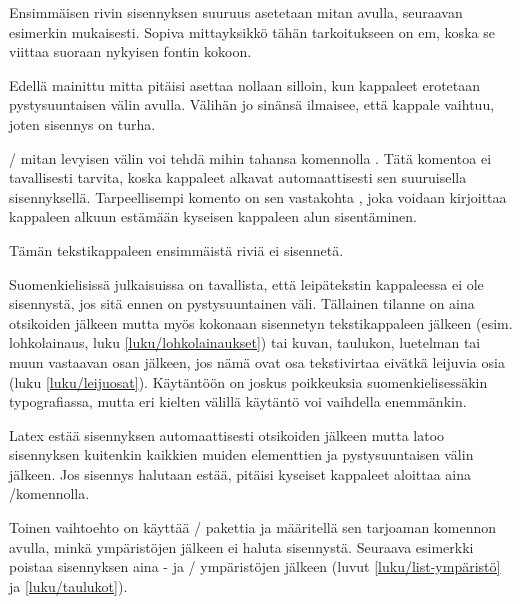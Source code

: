 Ensimmäisen rivin sisennyksen suuruus asetetaan mitan 
avulla, seuraavan esimerkin mukaisesti. Sopiva mittayksikkö tähän
tarkoitukseen on em, koska se viittaa suoraan nykyisen fontin kokoon.

\begin{koodilohkosis}
\setlength{\parindent}{1em}
\end{koodilohkosis}

\noindent
Edellä mainittu mitta pitäisi asettaa nollaan silloin, kun kappaleet
erotetaan pystysuuntaisen välin avulla. Välihän jo sinänsä ilmaisee,
että kappale vaihtuu, joten sisennys on turha.

\begin{koodilohkosis}
\setlength{\parskip}{1.3ex plus .2ex minus .1ex}
\setlength{\parindent}{0em}  %
\end{koodilohkosis}

\noindent
{}\-/ mitan levyisen välin voi tehdä mihin tahansa
komennolla . Tätä komentoa ei tavallisesti tarvita,
koska kappaleet alkavat automaattisesti sen suuruisella sisennyksellä.
Tarpeellisempi komento on sen vastakohta , joka
voidaan kirjoittaa kappaleen alkuun estämään kyseisen kappaleen alun
sisentäminen.

\begin{koodilohkosis}
\noindent
Tämän tekstikappaleen ensimmäistä riviä ei sisennetä.
\end{koodilohkosis}

\noindent
Suomenkielisissä julkaisuissa on tavallista, että leipätekstin
kappaleessa ei ole sisennystä, jos sitä ennen on pystysuuntainen väli.
Tällainen tilanne on aina otsikoiden jälkeen mutta myös kokonaan
sisennetyn tekstikappaleen jälkeen (esim. lohkolainaus, luku
\ref{luku/lohkolainaukset}) tai kuvan, taulukon, luetelman tai muun
vastaavan osan jälkeen, jos nämä ovat osa tekstivirtaa eivätkä leijuvia
osia (luku \ref{luku/leijuosat}). Käytäntöön on joskus poikkeuksia
suomenkielisessäkin typografiassa, mutta eri kielten välillä käytäntö
voi vaihdella enemmänkin.

Latex estää sisennyksen automaattisesti otsikoiden jälkeen mutta latoo
sisennyksen kuitenkin kaikkien muiden elementtien ja pystysuuntaisen
välin jälkeen. Jos sisennys halutaan estää, pitäisi kyseiset kappaleet
aloittaa aina \-/komennolla.

Toinen vaihtoehto on käyttää \-/ pakettia ja
määritellä sen tarjoaman komennon avulla, minkä ympäristöjen jälkeen ei
haluta sisennystä. Seuraava esimerkki poistaa sisennyksen aina
- ja \-/ ympäristöjen jälkeen (luvut
\ref{luku/list-ympäristö} ja \ref{luku/taulukot}).

